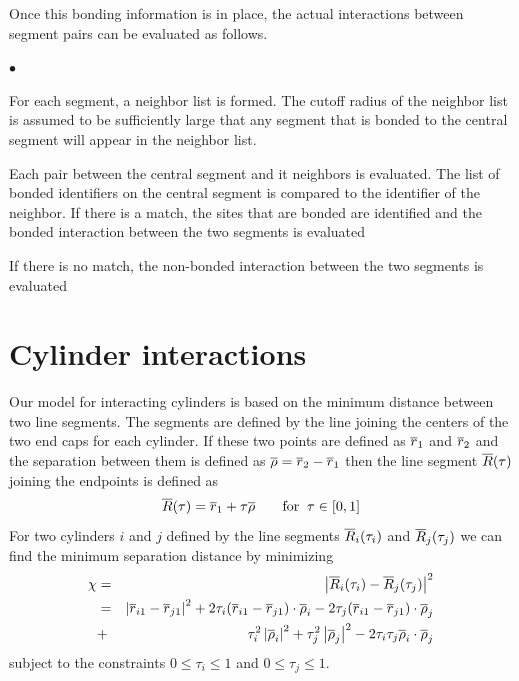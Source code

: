 \documentclass[12pt]{article}
\begin{document}
Once this bonding information is in place, the actual interactions between segment
pairs can be evaluated as follows.
\begin{list}{$\bullet$}{}
\item For each segment, a neighbor list is formed. The cutoff radius of the
neighbor list is assumed to be sufficiently large that any segment that is bonded
to the central segment will appear in the neighbor list.
\item Each pair between the central segment and it neighbors is evaluated. The
list of bonded identifiers on the central segment is compared to the identifier
of the neighbor. If there is a match, the sites that are bonded are identified and
the bonded interaction between the two segments is evaluated
\item If there is no match, the non-bonded interaction between the two segments is
evaluated
\end{list}

\section{Cylinder interactions}
Our model for interacting cylinders is based on the minimum distance between two
line segments. The segments are defined by the line joining the centers of the two
end caps for each cylinder. If these two points are defined as $\overline{r}_1$ and $\overline{r}_2$
and the separation between them is defined as $\overline{\rho} = \overline{r}_2-\overline{r}_1$ then the line
segment $\overline{R}(\tau)$ joining the endpoints is defined as
\[
\overline{R}(\tau) = \overline{r}_1 +\tau\overline{\rho}\;\;\;\;\;\;\;\mbox{for}\;\;\tau\in [0,1]
\]
For two cylinders $i$ and $j$ defined by the line segments $\overline{R}_i(\tau_i)$ and
$\overline{R}_j(\tau_j)$ we can find the minimum separation distance by minimizing
\begin{eqnarray*}
\chi & = & \left|\overline{R}_i(\tau_i)-\overline{R}_j(\tau_j)\right|^2 \\
     & = & \left|\overline{r}_{i1}-\overline{r}_{j1}\right|^2+2\tau_i(\overline{r}_{i1}-\overline{r}_{j1})\cdot\overline{\rho}_i
          -2\tau_j(\overline{r}_{i1}-\overline{r}_{j1})\cdot\overline{\rho}_j \\
     & + & \tau_i^2\left|\overline{\rho}_i\right|^2 + \tau_j^2\left|\overline{\rho}_j\right|^2
           - 2\tau_i\tau_j\overline{\rho}_i\cdot\overline{\rho}_j
\end{eqnarray*}
subject to the constraints $0\le\tau_i\le 1$ and $0\le\tau_j\le 1$.
\end{document}
